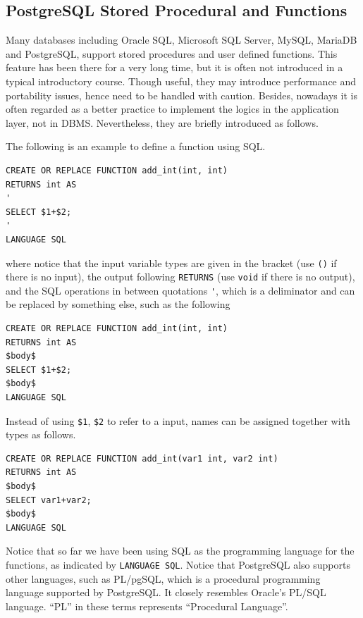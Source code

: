 \subsection{PostgreSQL Stored Procedural and Functions}


Many databases including Oracle SQL, Microsoft SQL Server, MySQL, MariaDB and PostgreSQL, support stored procedures and user defined functions. This feature has been there for a very long time, but it is often not introduced in a typical introductory course. Though useful, they may introduce performance and portability issues, hence need to be handled with caution. Besides, nowadays it is often regarded as a better practice to implement the logics in the application layer, not in DBMS. Nevertheless, they are briefly introduced as follows.

The following is an example to define a function using SQL.
\begin{lstlisting}
CREATE OR REPLACE FUNCTION add_int(int, int)
RETURNS int AS
'
SELECT $1+$2;
'
LANGUAGE SQL
\end{lstlisting}
where notice that the input variable types are given in the bracket (use \verb|()| if there is no input), the output following \verb|RETURNS| (use \verb|void| if there is no output), and the SQL operations in between quotations \verb|'|, which is a deliminator and can be replaced by something else, such as the following
\begin{lstlisting}
CREATE OR REPLACE FUNCTION add_int(int, int)
RETURNS int AS
$body$
SELECT $1+$2;
$body$
LANGUAGE SQL
\end{lstlisting}

Instead of using \verb|$1|, \verb|$2| to refer to a input, names can be assigned together with types as follows.
\begin{lstlisting}
CREATE OR REPLACE FUNCTION add_int(var1 int, var2 int)
RETURNS int AS
$body$
SELECT var1+var2;
$body$
LANGUAGE SQL
\end{lstlisting}

Notice that so far we have been using SQL as the programming language for the functions, as indicated by \verb|LANGUAGE SQL|. Notice that PostgreSQL also supports other languages, such as PL/pgSQL, which is a procedural programming language supported by PostgreSQL. It closely resembles Oracle's PL/SQL language. ``PL'' in these terms represents ``Procedural Language''.

